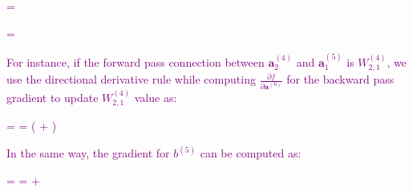 \textcolor{purple} { 
\be
\label{eq:compute_dl/dW}
 =           \:
\ee
}

\textcolor{purple} { 
\be
\label{eq:compute_dl/db}
 =           \:
\ee
}

\textcolor{purple} { 
For instance, if the forward pass connection between $\textbf{a}_{2}^{(4)}$ and $\textbf{a}_{1}^{(5)}$ is $W^{(4)}_{2,1}$, we use the directional derivative rule while computing $\frac{\partial f}{\partial \textbf{a}^{(6)}}$ for the backward pass gradient to update $W^{(4)}_{2,1}$ value as: }

\textcolor{purple} { 
\be
\label{eq:compute_specific_weight}
 =     = \Big (    +   \Big )   \:
\ee
}

\textcolor{purple} { In the same way, the gradient for $b^{(5)}$ can be computed as: }

\textcolor{purple} { 
\be
\label{eq:compute_specific_bias}
 =    =    +   \:
\ee
}


